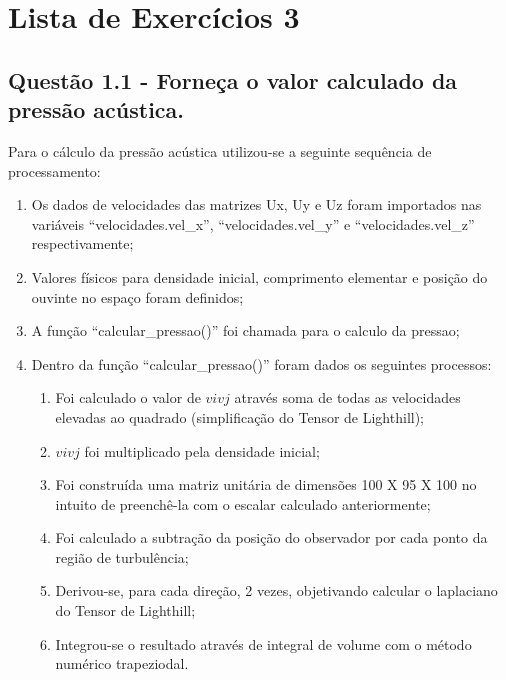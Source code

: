 \tableofcontents*
\cleardoublepage

\chapter{Lista de Exercícios 3}

\section{Questão 1.1 - Forneça o valor calculado da pressão acústica.}
Para o cálculo da pressão acústica utilizou-se a seguinte sequência de processamento:
\begin{enumerate}
	\item Os dados de velocidades das matrizes Ux, Uy e Uz foram importados nas variáveis
``velocidades.vel\_x'', ``velocidades.vel\_y'' e ``velocidades.vel\_z'' respectivamente;
	\item Valores físicos para densidade inicial, comprimento elementar e posição do ouvinte no espaço foram definidos;
	\item A função ``calcular\_pressao()'' foi chamada para o calculo da pressao;
	\item Dentro da função ``calcular\_pressao()'' foram dados os seguintes processos:
	\begin{enumerate} 
		\item Foi calculado o valor de \begin{math}vivj\end{math} através soma de todas as velocidades elevadas ao quadrado (simplificação do Tensor de Lighthill);
		\item \begin{math}vivj\end{math} foi multiplicado pela densidade inicial;
		\item Foi construída uma matriz unitária de dimensões 100 X 95 X 100 no intuito de preenchê-la com o escalar calculado anteriormente;
		\item Foi calculado a subtração da posição do observador por cada ponto da região de turbulência;
		\item Derivou-se, para cada direção, 2 vezes, objetivando calcular o laplaciano do Tensor de Lighthill;
		\item Integrou-se o resultado através de integral de volume com o método numérico trapeziodal.
	\end{enumerate}
\end{enumerate}

